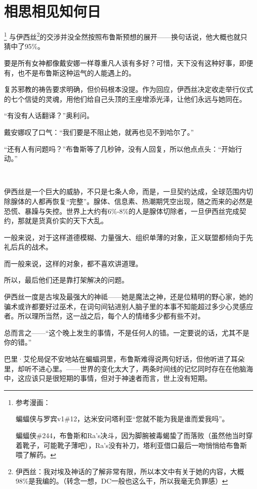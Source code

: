 \documentclass[../main]{subfiles}
\begin{document}
\section{相思相见知何日}

\footnote[1]{参考漫画：

    蝙蝠侠与罗宾v1\#12，达米安问塔利亚“您就不能为我是谁而爱我吗”。

    蝙蝠侠\#244，布鲁斯和Ra's决斗，因为脚腕被毒蝎蛰了而落败（虽然他当时穿着靴子，可能靴子薄吧），Ra's没有补刀，塔利亚借口最后一吻悄悄给布鲁斯喂了解药。}
与伊西丝\footnote[2]{伊西丝：我对埃及神话的了解非常有限，所以本文中有关于她的内容，大概98\%是我编的。（转念一想，DC一般也这么干，所以我毫无负罪感）}的交涉并没全然按照布鲁斯预想的展开——换句话说，他大概也就只猜中了95\%。

要是所有女神都像戴安娜一样尊重凡人该有多好？可惜，天下没有这种好事，即便有，也不是布鲁斯这种运气的人能遇上的。

复苏邪教的祷告要求明确，但价码根本没提。作为回应，伊西丝决定收走举行仪式的七个信徒的灵魂，用他们给自己头顶的王座增添光泽，让他们永远与她同在。

“有没有人话翻译？”奥利问。

戴安娜叹了口气：“我们要是不阻止她，就再也见不到哈尔了。”

“还有人有问题吗？”布鲁斯等了几秒钟，没有人回复，所以他点点头：“开始行动。”

~\

伊西丝是一个巨大的威胁，不只是七条人命，而是，一旦契约达成，全球范围内切除腺体的人都再恢复“完整”。腺体、信息素、热潮期凭空出现，随之而来的必然是恐慌、暴躁与失控。世界上大约有6\%-8\%的人是腺体切除者，一旦伊西丝完成契约，那就是货真价实的天下大乱。

一般来说，对于这样道德模糊、力量强大、组织单薄的对象，正义联盟都倾向于先礼后兵的战术。

而一般来说，这样的对象，都不喜欢讲道理。

所以，最后他们还是靠打架解决的问题。

伊西丝一度是古埃及最强大的神祗——她是魔法之神，还是位精明的野心家，她的骗术或许都要好过巫术，在词句间钻进别人脑子里的本事不知能超过多少心灵感应者。所以理所当然，这一战之后，每个人的情绪多少都有些不对。

总而言之——“这个晚上发生的事情，不是任何人的错。一定要说的话，尤其不是你的错。”

巴里·艾伦局促不安地站在蝙蝠洞里，布鲁斯难得说两句好话，但他听进了耳朵里，却听不进心里。——世界的变化太大了，两条时间线的记忆同时存在在他脑海中，这应该只是很短期的事情，但对于神速者而言，世上没有短期。
\end{document}
